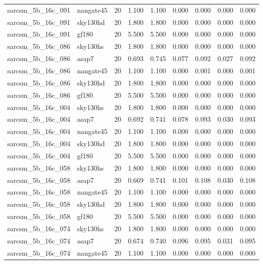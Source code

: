 \begin{tabular}{llrrrrrrr}
sarcsm\_5b\_16c\_091 & nangate45 & 20 & 1.100 & 1.100 & 0.000 & 0.000 & 0.000 & 0.000 \\
sarcsm\_5b\_16c\_091 & sky130hd & 20 & 1.800 & 1.800 & 0.000 & 0.000 & 0.000 & 0.000 \\
sarcsm\_5b\_16c\_091 & gf180 & 20 & 5.500 & 5.500 & 0.000 & 0.000 & 0.000 & 0.000 \\
sarcsm\_5b\_16c\_086 & sky130hs & 20 & 1.800 & 1.800 & 0.000 & 0.000 & 0.000 & 0.000 \\
sarcsm\_5b\_16c\_086 & asap7 & 20 & 0.693 & 0.745 & 0.077 & 0.092 & 0.027 & 0.092 \\
sarcsm\_5b\_16c\_086 & nangate45 & 20 & 1.100 & 1.100 & 0.000 & 0.001 & 0.000 & 0.001 \\
sarcsm\_5b\_16c\_086 & sky130hd & 20 & 1.800 & 1.800 & 0.000 & 0.000 & 0.000 & 0.000 \\
sarcsm\_5b\_16c\_086 & gf180 & 20 & 5.500 & 5.500 & 0.000 & 0.000 & 0.000 & 0.000 \\
sarcsm\_5b\_16c\_004 & sky130hs & 20 & 1.800 & 1.800 & 0.000 & 0.000 & 0.000 & 0.000 \\
sarcsm\_5b\_16c\_004 & asap7 & 20 & 0.692 & 0.741 & 0.078 & 0.093 & 0.030 & 0.093 \\
sarcsm\_5b\_16c\_004 & nangate45 & 20 & 1.100 & 1.100 & 0.000 & 0.000 & 0.000 & 0.000 \\
sarcsm\_5b\_16c\_004 & sky130hd & 20 & 1.800 & 1.800 & 0.000 & 0.000 & 0.000 & 0.000 \\
sarcsm\_5b\_16c\_004 & gf180 & 20 & 5.500 & 5.500 & 0.000 & 0.000 & 0.000 & 0.000 \\
sarcsm\_5b\_16c\_058 & sky130hs & 20 & 1.800 & 1.800 & 0.000 & 0.000 & 0.000 & 0.000 \\
sarcsm\_5b\_16c\_058 & asap7 & 20 & 0.669 & 0.741 & 0.101 & 0.108 & 0.030 & 0.108 \\
sarcsm\_5b\_16c\_058 & nangate45 & 20 & 1.100 & 1.100 & 0.000 & 0.000 & 0.000 & 0.000 \\
sarcsm\_5b\_16c\_058 & sky130hd & 20 & 1.800 & 1.800 & 0.000 & 0.000 & 0.000 & 0.000 \\
sarcsm\_5b\_16c\_058 & gf180 & 20 & 5.500 & 5.500 & 0.000 & 0.000 & 0.000 & 0.000 \\
sarcsm\_5b\_16c\_074 & sky130hs & 20 & 1.800 & 1.800 & 0.000 & 0.000 & 0.000 & 0.000 \\
sarcsm\_5b\_16c\_074 & asap7 & 20 & 0.674 & 0.740 & 0.096 & 0.095 & 0.031 & 0.095 \\
sarcsm\_5b\_16c\_074 & nangate45 & 20 & 1.100 & 1.100 & 0.000 & 0.000 & 0.000 & 0.000 \\

\end{tabular}
